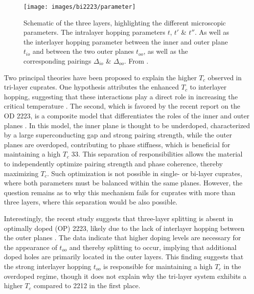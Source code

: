\begin{figure}
	\centering
	\texttt{[image: images/bi2223/parameter]}
	\caption{Schematic of the three  layers, highlighting the different microscopic parameters. The intralayer hopping parameters $t$, $t'$ \& $t''$. As well as the interlayer hopping parameter between the inner and outer plane $t_{io}$ and between the two outer planes $t_{oo}$, as well as the corresponding pairings $\Delta_{io}$ \& $\Delta_{oo}$. From \cite{luo_electronic_2023}.}
	\label{fig:parameter}
\end{figure}


Two principal theories have been proposed to explain the higher $T_c$ observed in tri-layer cuprates.
One hypothesis attributes the enhanced $T_c$ to interlayer hopping, suggesting that these interactions play a direct role in increasing the critical temperature \cite{chakravarty_explanation_2004,nishiguchi_superconductivity_2013}.
The second, which is favored by the recent report on the OD 2223, is a composite model that differentiates the roles of the inner and outer planes \cite{kivelson_making_2002,berg_route_2008,okamoto_enhanced_2008}.
In this model, the inner plane is thought to be underdoped, characterized by a large superconducting gap and strong pairing strength, while the outer planes are overdoped, contributing to phase stiffness, which is beneficial for maintaining a high $T_c$ \cite{emery_importance_1995} 33.
This separation of responsibilities allows the material to independently optimize pairing strength and phase coherence, thereby maximizing $T_c$.
Such optimization is not possible in single- or bi-layer cuprates, where both parameters must be balanced within the same planes.
However, the question remains as to why this mechanism fails for cuprates with more than three  layers, where this separation would be also possible.

Interestingly, the recent study suggests that three-layer splitting is absent in optimally doped (OP) 2223, likely due to the lack of interlayer hopping between the outer planes \cite{luo_electronic_2023}.
The data indicate that higher doping levels are necessary for the appearance of $t_{oo}$ and thereby splitting to occur, implying that additional doped holes are primarily located in the outer layers.
This finding suggests that the strong interlayer hopping $t_{oo}$ is responsible for maintaining a high $T_c$ in the overdoped regime, though it does not explain why the tri-layer system exhibits a higher $T_c$ compared to 2212 in the first place.

